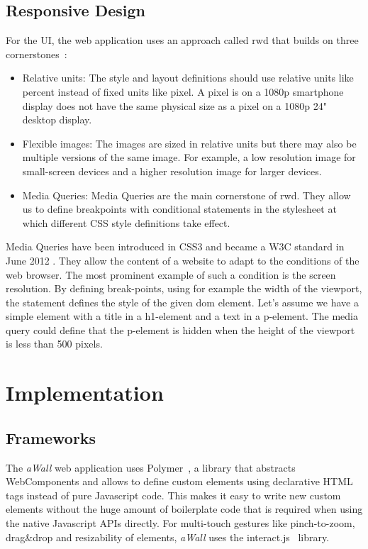 \documentclass{sigchi}
\begin{document}
\subsection{Responsive Design}
For the UI, the web application uses an approach called \gls{rwd} that builds on three cornerstones~\cite{Marcotte:2011}:
\begin{itemize}
	\item Relative units: The style and layout definitions should use relative units like percent instead of fixed units like pixel. A pixel is on a 1080p smartphone display does not have the same physical size as a pixel on a 1080p 24" desktop display. 
	
	\item Flexible images: The images are sized in relative units but there may also be multiple versions of the same image. For example, a low resolution image for small-screen devices and a higher resolution image for larger devices.
	
	\item Media Queries: Media Queries are the main cornerstone of \gls{rwd}. They allow us to define breakpoints with conditional statements in the stylesheet at which different CSS style definitions take effect.
\end{itemize}

Media Queries have been introduced in CSS3 and became a W3C standard in June 2012 \cite{mediaqueriesW3C}.
They allow the content of a website to adapt to the conditions of the web browser.
The most prominent example of such a condition is the screen resolution.
By defining break-points, using for example the width of the viewport, the statement defines the style of the given \gls{dom} element.
Let's assume we have a simple element with a title in a h1-element and a text in a p-element.
The media query could define that the p-element is hidden when the height of the viewport is less than 500 pixels.


\section{Implementation}
\subsection{Frameworks}
The \textit{aWall} web application uses Polymer~\cite{polymer}, a library that abstracts WebComponents and allows to define custom elements using declarative HTML tags instead of pure Javascript code.
This makes it easy to write new custom elements without the huge amount of boilerplate code that is required when using the native Javascript APIs directly.
For multi-touch gestures like pinch-to-zoom, drag\&drop and resizability of elements, \textit{aWall} uses the interact.js~\cite{interactJs} library.
\end{document}
